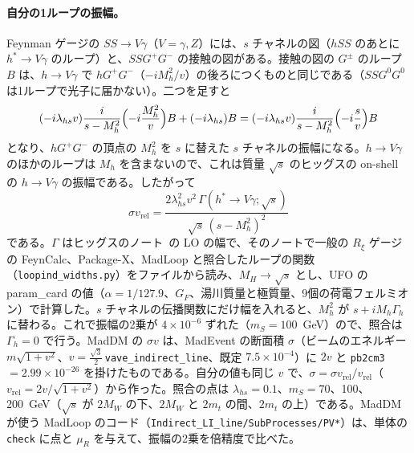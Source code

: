 \documentclass[a4paper,10pt]{ltjsarticle}
\begin{document}
\paragraph{自分の1ループの振幅。}Feynman ゲージの $SS\to V\gamma$（$V=\gamma,Z$）には、$s$ チャネルの図（$hSS$ のあとに $h^*\to V\gamma$ のループ）と、$SSG^+G^-$ の接触の図がある。接触の図の $G^\pm$ のループ $B$ は、$h\to V\gamma$ で $hG^+G^-$（$-iM_h^2/v$）の後ろにつくものと同じである（$SSG^0G^0$ は1ループで光子に届かない）。二つを足すと
\[
(-i\lambda_{hs}v)\frac{i}{s-M_h^2}\Bigl(-i\frac{M_h^2}{v}\Bigr)B+(-i\lambda_{hs})B=(-i\lambda_{hs}v)\frac{i}{s-M_h^2}\Bigl(-i\frac sv\Bigr)B
\]
となり、$hG^+G^-$ の頂点の $M_h^2$ を $s$ に替えた $s$ チャネルの振幅になる。$h\to V\gamma$ のほかのループは $M_h$ を含まないので、これは質量 $\sqrt s$ のヒッグスの on-shell の $h\to V\gamma$ の振幅である。したがって
\[
\sigma v_{\mathrm{rel}}=\frac{2\lambda_{hs}^2v^2\,\Gamma(h^*\to V\gamma;\sqrt s)}{\sqrt s\,(s-M_h^2)^2}
\]
である。$\Gamma$ はヒッグスのノート~\cite{higgsnote}の LO の幅で、そのノートで一般の $R_\xi$ ゲージの FeynCalc、Package-X、MadLoop と照合したループの関数（\texttt{loopind\_widths.py}）をファイルから読み、$M_H\to\sqrt s$ とし、UFO の param\_card の値（$\alpha=1/127.9$、$G_F$、湯川質量と極質量、9個の荷電フェルミオン）で計算した。$s$ チャネルの伝播関数にだけ幅を入れると、$M_h^2$ が $s+iM_h\Gamma_h$ に替わる。これで振幅の2乗が $4\times10^{-6}$ ずれた（$m_S=100$~GeV）ので、照合は $\Gamma_h=0$ で行う。MadDM の $\sigma v$ は、MadEvent の断面積 $\sigma$（ビームのエネルギー $m\sqrt{1+v^2}$、$v=\frac{\sqrt3}2\,$\texttt{vave\_indirect\_line}、既定 $7.5\times10^{-4}$）に $2v$ と \texttt{pb2cm3} $=2.99\times10^{-26}$ を掛けたものである。自分の値も同じ $v$ で、$\sigma=\sigma v_{\mathrm{rel}}/v_{\mathrm{rel}}$（$v_{\mathrm{rel}}=2v/\sqrt{1+v^2}$）から作った。照合の点は $\lambda_{hs}=0.1$、$m_S=70$、100、200~GeV（$\sqrt s$ が $2M_W$ の下、$2M_W$ と $2m_t$ の間、$2m_t$ の上）である。MadDM が使う MadLoop のコード（\texttt{Indirect\_LI\_line/SubProcesses/PV*}）は、単体の \texttt{check} に点と $\mu_R$ を与えて、振幅の2乗を倍精度で比べた。
\end{document}
